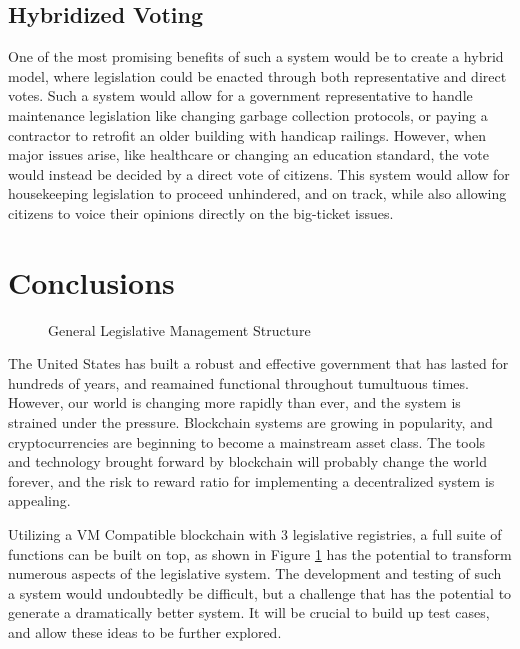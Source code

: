 \documentclass[letterpaper,twocolumn]{article}
\begin{document}
\subsection*{Hybridized Voting}
One of the most promising benefits of such a system would be to create a hybrid model, where legislation could be enacted through both representative and direct votes.  Such a system would allow for a government representative to handle maintenance legislation like changing garbage collection protocols, or paying a contractor to retrofit an older building with handicap railings.  However, when major issues arise, like healthcare or changing an education standard, the vote would instead be decided by a direct vote of citizens.  This system would allow for housekeeping legislation to proceed unhindered, and on track, while also allowing citizens to voice their opinions directly on the big-ticket issues.

\section*{Conclusions}

\begin{figure}[t]
	\caption{General Legislative Management Structure} \label{fig:legislative_structure}
\end{figure}

The United States has built a robust and effective government that has lasted for hundreds of years, and reamained functional throughout tumultuous times.  However, our world is changing more rapidly than ever, and the system is strained under the pressure.  Blockchain systems are growing in popularity, and cryptocurrencies are beginning to become a mainstream asset class.  The tools and technology brought forward by blockchain will probably change the world forever, and the risk to reward ratio for implementing a decentralized system is appealing.

Utilizing a VM Compatible blockchain with 3 legislative registries, a full suite of functions can be built on top, as shown in Figure \ref{fig:legislative_structure} has the potential to transform numerous aspects of the legislative system.  The development and testing of such a system would undoubtedly be difficult, but a challenge that has the potential to generate a dramatically better system.  It will be crucial to build up test cases, and allow these ideas to be further explored.
\end{document}
